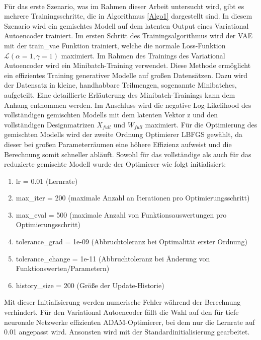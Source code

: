 \documentclass[%
thesis=student,%
coverpage=false,%
titlepage=false,%
headmarks=true, %
german,%
font=libertine, %
math=newpxtx, %
BCOR=5mm,%
coverBCOR=11mm%
]{tumbook}
\theoremstyle{break}
\begin{document}
\\
Für das erste Szenario, was im Rahmen dieser Arbeit untersucht wird, gibt es mehrere Trainingsschritte, die in Algorithmus \ref{Algo1} dargestellt sind. In diesem Szenario wird ein gemischtes Modell auf dem latenten Output eines Variational Autoencoder trainiert. Im ersten Schritt des Trainingsalgorithmus wird der VAE mit der train\_vae Funktion trainiert, welche die normale Loss-Funktion $\mathcal{L}(\alpha=1,\gamma=1) $ maximiert. Im Rahmen des Trainings des Variational Autoencoder wird ein Minibatch-Training verwendet. Diese Methode ermöglicht ein effizientes Training generativer Modelle auf großen Datensätzen. Dazu wird der Datensatz in kleine, handhabbare Teilmengen, sogenannte Minibatches, aufgeteilt. Eine detaillierte Erläuterung des Minibatch-Trainings kann dem Anhang entnommen werden. Im Anschluss wird die negative Log-Likelihood des vollständigen gemischten Modells mit dem latenten Vektor z und den vollständigen Designmatrizen $X_{full}$ und $W_{full}$ maximiert. Für die Optimierung des gemischten Modells wird der zweite Ordnung Optimierer LBFGS gewählt, da dieser bei großen Parameterräumen eine höhere Effizienz aufweist und die Berechnung somit schneller abläuft. Sowohl für das vollständige als auch für das reduzierte gemischte Modell wurde der Optimierer wie folgt initialisiert:
\begin{enumerate}
	\item lr = 0.01 (Lernrate)
	\item max\_iter = 200 (maximale Anzahl an Iterationen pro Optimierungsschritt)
	\item max\_eval = 500 (maximale Anzahl von Funktionsauswertungen pro Optimierungsschritt)
	\item tolerance\_grad = 1e-09 (Abbruchtoleranz bei Optimalität erster Ordnung)
	\item tolerance\_change = 1e-11 (Abbruchtoleranz bei Änderung von Funktionswerten/Parametern)
	\item history\_size = 200 (Größe der Update-Historie)
\end{enumerate}
Mit dieser Initialisierung werden numerische Fehler während der Berechnung verhindert.
Für den Variational Autoencoder fällt die Wahl auf den für tiefe neuronale Netzwerke effizienten ADAM-Optimierer, bei dem nur die Lernrate auf 0.01 angepasst wird. Ansonsten wird mit der Standardinitialisierung gearbeitet.\\
\end{document}
